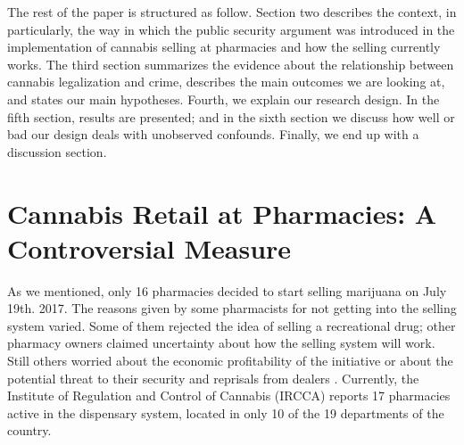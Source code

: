 \documentclass[11pt]{article}
\begin{document}
The rest of the paper is structured as follow. Section two describes the context, in particularly, the way in which the public security argument was introduced in the implementation of cannabis selling at pharmacies and how the selling currently works. The third section summarizes the evidence about the relationship between cannabis legalization and crime, describes the main outcomes we are looking at, and states our main hypotheses. Fourth, we explain our research design. In the fifth section, results are presented; and in the  sixth section we discuss how well or bad our design deals with unobserved confounds. Finally, we end up with a discussion section.

\section{Cannabis Retail at Pharmacies: A Controversial Measure}
As we mentioned, only 16 pharmacies decided to start selling marijuana on July 19th. 2017. The reasons given by some pharmacists for not getting into the selling system varied. Some of them rejected the idea of selling a recreational drug; other pharmacy owners claimed uncertainty about how the selling system will work. Still others worried about the economic profitability of the initiative or about the potential threat to their security and reprisals from dealers \citep{boidi2016}. Currently, the Institute of Regulation and Control of Cannabis (IRCCA) reports 17 pharmacies active in the dispensary system, located in only 10 of the 19 departments of the country.
\end{document}

